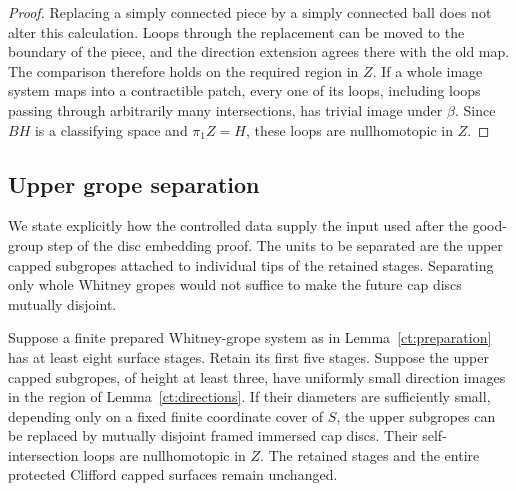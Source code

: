\begin{proof}
Replacing a simply connected piece by a simply connected ball does
not alter this calculation.  Loops through the replacement can be
moved to the boundary of the piece, and the direction extension
agrees there with the old map.  The comparison therefore holds on
the required region in $Z$.  If a whole image system maps into a
contractible patch, every one of its loops, including loops passing
through arbitrarily many intersections, has trivial image under
$\beta$.  Since $BH$ is a classifying space and $\pi_1Z=H$, these
loops are nullhomotopic in $Z$.
\end{proof}

\subsection{Upper grope separation}

We state explicitly how the controlled data supply the input used
after the good-group step of the disc embedding proof.  The units to
be separated are the upper capped subgropes attached to individual
tips of the retained stages.  Separating only whole Whitney gropes
would not suffice to make the future cap discs mutually disjoint.

\begin{lemma}\label{ct:upper-replacement}
Suppose a finite prepared Whitney-grope system as in
Lemma~\ref{ct:preparation} has at least eight surface stages.  Retain
its first five stages.  Suppose the upper capped subgropes, of height
at least three, have uniformly small direction images in the region
of Lemma~\ref{ct:directions}.  If their diameters are sufficiently
small, depending only on a fixed finite coordinate cover of $S$, the
upper subgropes can be replaced by mutually disjoint framed immersed
cap discs.  Their self-intersection loops are nullhomotopic in $Z$.
The retained stages and the entire protected Clifford capped
surfaces remain unchanged.
\end{lemma}

